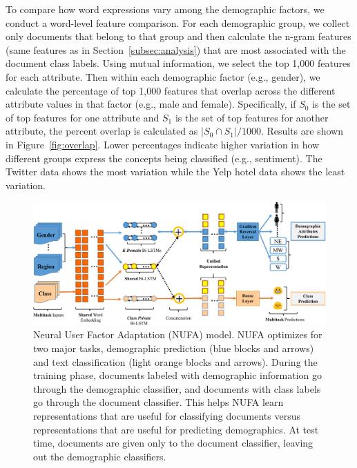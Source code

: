 To compare how word expressions vary among the demographic factors, we conduct a word-level feature comparison.
For each demographic group, we collect only documents that belong to that group and then calculate the n-gram features (same features as in Section~\ref{subsec:analysis}) that are most associated with the document class labels.
Using mutual information, we select the top 1,000 features for each attribute.
Then within each demographic factor (e.g., gender),
we calculate the percentage of top 1,000 features that overlap across the different attribute values in that factor (e.g., male and female).
Specifically, if $S_0$ is the set of top features for one attribute and $S_1$ is the set of top features for another attribute, the percent overlap is calculated as $|S_0 \cap S_1|/1000$.
Results are shown in Figure~\ref{fig:overlap}. 
Lower percentages indicate higher variation in how different groups express the concepts being classified (e.g., sentiment).
The Twitter data shows the most variation while the Yelp hotel data shows the least variation.



\begin{figure}[htp]
\centering
\includegraphics[scale=0.47]{./images/chapter4/model.pdf}
\caption{Neural User Factor Adaptation (NUFA) model. 
NUFA optimizes for two major tasks, demographic prediction (blue blocks and arrows) and text classification (light orange blocks and arrows). 
During the training phase, documents labeled with demographic information go through the demographic classifier, and documents with class labels go through the document classifier. 
This helps NUFA learn representations that are useful for classifying documents versus representations that are useful for predicting demographics.
At test time, documents are given only to the document classifier, leaving out the demographic classifiers. 
}
\label{fig:model}
\end{figure}

